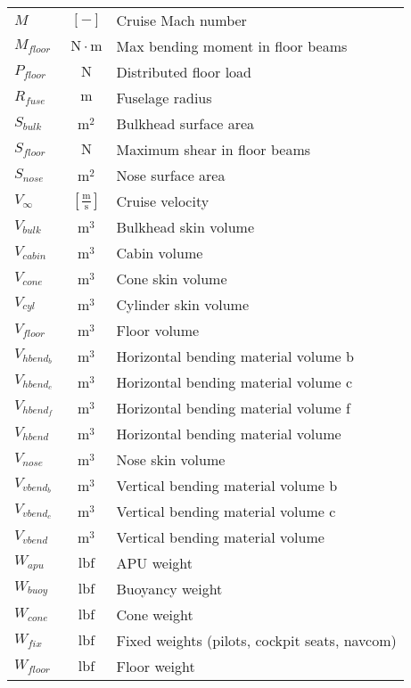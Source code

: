 \documentclass[12pt]{article}
\begin{document}
{\begin{supertabular}{lcl}
$M$ & $~[-]$ & Cruise Mach number \\
$M_{floor}$ & $~\mathrm{N\cdot m}$ & Max bending moment in floor beams \\
$P_{floor}$ & $~\mathrm{N}$ & Distributed floor load \\
$R_{fuse}$ & $~\mathrm{m}$ & Fuselage radius \\
$S_{bulk}$ & $~\mathrm{m^{2}}$ & Bulkhead surface area \\
$S_{floor}$ & $~\mathrm{N}$ & Maximum shear in floor beams \\
$S_{nose}$ & $~\mathrm{m^{2}}$ & Nose surface area \\
$V_{\infty}$ & $~\mathrm{[\tfrac{m}{s}]}$ & Cruise velocity \\
$V_{bulk}$ & $~\mathrm{m^{3}}$ & Bulkhead skin volume \\
$V_{cabin}$ & $~\mathrm{m^{3}}$ & Cabin volume \\
$V_{cone}$ & $~\mathrm{m^{3}}$ & Cone skin volume \\
$V_{cyl}$ & $~\mathrm{m^{3}}$ & Cylinder skin volume \\
$V_{floor}$ & $~\mathrm{m^{3}}$ & Floor volume \\
$V_{hbend_{b}}$ & $~\mathrm{m^{3}}$ & Horizontal bending material volume b \\
$V_{hbend_{c}}$ & $~\mathrm{m^{3}}$ & Horizontal bending material volume c \\
$V_{hbend_{f}}$ & $~\mathrm{m^{3}}$ & Horizontal bending material volume f \\
$V_{hbend}$ & $~\mathrm{m^{3}}$ & Horizontal bending material volume \\
$V_{nose}$ & $~\mathrm{m^{3}}$ & Nose skin volume \\
$V_{vbend_{b}}$ & $~\mathrm{m^{3}}$ & Vertical bending material volume b \\
$V_{vbend_{c}}$ & $~\mathrm{m^{3}}$ & Vertical bending material volume c \\
$V_{vbend}$ & $~\mathrm{m^{3}}$ & Vertical bending material volume \\
$W_{apu}$ & $~\mathrm{lbf}$ & APU weight \\
$W_{buoy}$ & $~\mathrm{lbf}$ & Buoyancy weight \\
$W_{cone}$ & $~\mathrm{lbf}$ & Cone weight \\
$W_{fix}$ & $~\mathrm{lbf}$ & Fixed weights (pilots, cockpit seats, navcom) \\
$W_{floor}$ & $~\mathrm{lbf}$ & Floor weight \\

\end{supertabular}}
\end{document}
